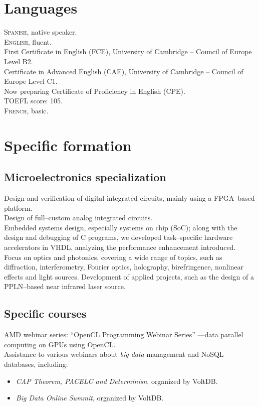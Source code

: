 \documentclass[11pt, a4paper]{article}
\newcommand{\years}[1]{\marginnote{\scriptsize #1}}
\begin{document}
\section*{Languages} %
\noindent
\textsc{Spanish}, native speaker.\\

\textsc{English}, fluent.\\
First Certificate in English (FCE), University of Cambridge -- Council of Europe Level B2.\\
Certificate in Advanced English (CAE), University of Cambridge -- Council of Europe Level C1.\\
Now preparing Certificate of Proficiency in English (CPE).\\
TOEFL score: 105.\\

\textsc{French}, basic.



\section*{Specific formation} %
\subsection*{Microelectronics specialization}
\noindent
\years{2008--2010}Design and verification of digital integrated circuits, mainly using a FPGA--based platform.\\
Design of full--custom analog integrated circuits.\\
Embedded systems design, especially systems on chip (SoC); along with the design and debugging of C programs, we developed task--specific hardware accelerators in VHDL, analyzing the performance enhancement introduced.\\
Focus on optics and photonics, covering a wide range of topics, such as diffraction, interferometry, Fourier optics, holography, birefringence, nonlinear effects and light sources. Development of applied projects, such as the design of a PPLN--based near infrared laser source.

\subsection*{Specific courses}
\noindent
\years{2010}AMD webinar series: ``OpenCL Programming Webinar Series'' ---data parallel computing on GPUs using OpenCL.\\
\years{2011}Assistance to various webinars about \textit{big data} management and NoSQL databases, including:
\begin{itemize}
	\item  \emph{CAP Theorem, PACELC and Determinisn}, organized by VoltDB.
	\item  \emph{Big Data Online Summit}, organized by VoltDB.
\end{itemize}
\end{document}
